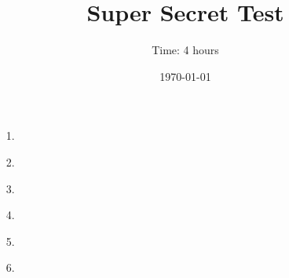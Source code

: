 \documentclass{article}
\title{Super Secret Test} %
\author{Time: 4 hours}
\date{\today} %
\begin{document}
 \maketitle
\begin{enumerate}

\item[1.] %


\item[2.]


\item[3.]


\item[4.]


\item[5.]


\item[6.]


\end{enumerate}
\end{document}
